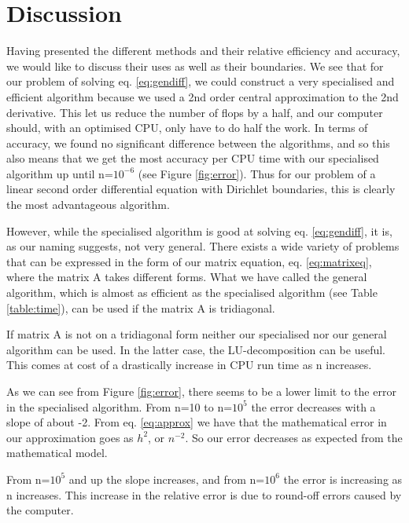 \section{Discussion}
\label{sec:discussion}

Having presented the different methods and their relative efficiency and
accuracy, we would like to discuss their uses as well as their boundaries.
We see that for our problem of solving eq. \ref{eq:gendiff}, we could construct
a very specialised and efficient algorithm because we used a 2nd order
central approximation to the 2nd derivative. This let us reduce the number of
flops by a half, and our computer should, with an optimised CPU, only have to do
half the work. In terms of accuracy, we found no significant difference between
the algorithms, and so this also means that we get the most accuracy per CPU time
with our specialised algorithm up until n=$10^{-6}$ (see Figure \ref{fig:error}).
Thus for our problem of a linear second order differential equation with
Dirichlet boundaries, this is clearly the most advantageous algorithm.

However, while the specialised algorithm is good at solving eq. \ref{eq:gendiff},
it is, as our naming suggests, not very general. There exists a wide variety of
problems that can be expressed in the form of our matrix equation, eq.
\ref{eq:matrixeq}, where the matrix A takes different forms. What we have called the general algorithm, which is almost as efficient as the specialised algorithm (see Table \ref{table:time}), can be used if the matrix A is tridiagonal.

If matrix A is not on a tridiagonal form neither our specialised nor our general algorithm can be used. In the latter case, the LU-decomposition can be useful. This comes at cost of a drastically increase in CPU run time as n increases.  
 


As we can see from Figure \ref{fig:error}, there seems to be a lower limit to the error in the specialised algorithm. From n=10 to n=$10^5$ the error decreases with a slope of about -2. From eq. \ref{eq:approx} we have that the mathematical error in our approximation goes as $h^2$, or $n^{-2}$. So our error decreases as expected from the mathematical model. 

From n=$10^5$ and up the slope increases, and from n=$10^6$ the error is increasing as n increases. This increase in the relative error is due to round-off errors caused by the computer. 